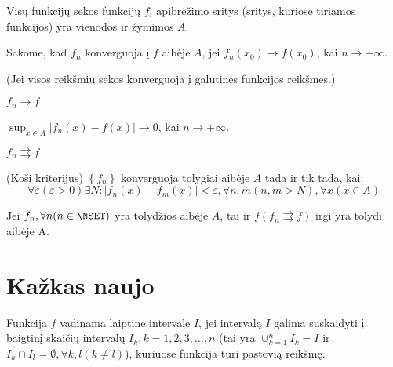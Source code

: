 \begin{note}
  Visų funkcijų sekos funkcijų $f_{i}$ apibrėžimo sritys (sritys, kuriose
  tiriamos funkcijos) yra vienodos ir žymimos $A$.
\end{note}

\begin{defn}
  Sakome, kad $f_{n}$ konverguoja į $f$ aibėje $A$, jei 
  $f_{n}(x_{0}) \to f(x_{0})$, kai $n \to +\infty$.

  (Jei visos reikšmių sekos konverguoja į galutinės funkcijos reikšmes.)

  \begin{notation}
    $f_{n} \to f$
  \end{notation}
\end{defn}

\begin{defn}
  $\sup_{x \in A} | f_{n}(x) - f(x) | \to 0$, kai $n \to +\infty$.
  \begin{notation}
    $f_{n} \rightrightarrows f$
  \end{notation}
\end{defn}

\begin{prop}
  (Koši kriterijus) $\left\{ f_{n} \right\}$ konverguoja tolygiai 
  aibėje $A$ tada ir tik tada, kai:
  \begin{equation*}
    \forall \varepsilon (\varepsilon > 0) \exists N : %
      |f_{n}(x) - f_{m}(x)| < \varepsilon, %
      \forall n, m (n, m > N), \forall x (x \in A)
  \end{equation*}
\end{prop}

\begin{prop}
  Jei $f_{n}, \forall n(n \in \NSET)$ yra tolydžios aibėje $A$, tai ir
  $f (f_n \rightrightarrows f)$ irgi yra tolydi aibėje A.
\end{prop}

\section{Kažkas naujo}

\begin{defn}
  Funkcija $f$ vadinama laiptine intervale $I$, jei intervalą $I$ galima
  suskaidyti į baigtinį skaičių intervalų ${I_{k}, k=1, 2, 3,\ldots, n}$
  (tai yra $\cup_{k=1}^{n} I_{k} = I$ ir 
  $I_{k} \cap I_{l} = \emptyset, \forall k, l (k \neq l)$), kuriuose
  funkcija turi pastovią reikšmę.
\end{defn}

